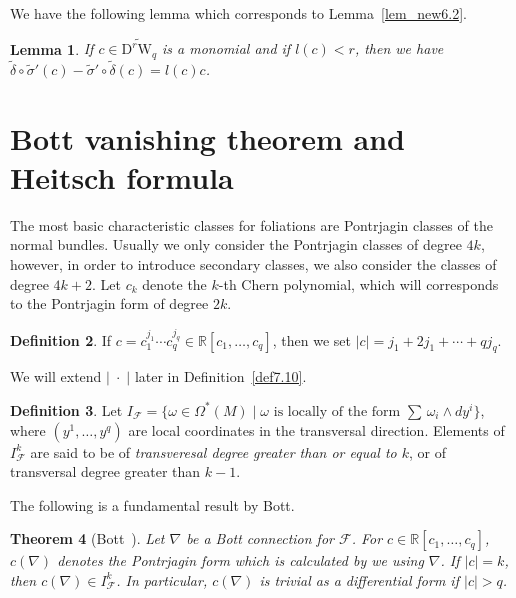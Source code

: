 \documentclass[12pt]{amsart}
\newcommand{\CF}{{\mathcal F}}
\newcommand{\R}{{\mathbb R}}
\newcommand{\W}{\mathrm{W}}
\newcommand{\D}{\mathrm{D}}
\DeclareMathOperator{\ord}{\mathrm{ord}}
\newcommand{\norm}[1]{\lvert#1\rvert}
\newtheorem{theorem}{Theorem}[section]
\newtheorem{lemma}[theorem]{Lemma}
\theoremstyle{definition}
\newtheorem{definition}[theorem]{Definition}
\theoremstyle{remark}
\begin{document}
We have the following lemma which corresponds to Lemma~\ref{lem_new6.2}.

\begin{lemma}
\label{lem6.9}
If $c\in\widetilde{\D^r\W_q}$ is a monomial and if $l(c)<r$, then we have $\widetilde\delta\circ\widetilde\sigma'(c)-\widetilde\sigma'\circ\widetilde\delta(c)=l(c)c$.
\end{lemma}

\section{Bott vanishing theorem and Heitsch formula}
The most basic characteristic classes for foliations are Pontrjagin classes of the normal bundles.
Usually we only consider the Pontrjagin classes of degree $4k$, however, in order to introduce secondary classes, we also consider the classes of degree $4k+2$.
Let $c_k$ denote the $k$-th Chern polynomial, which will corresponds to the Pontrjagin form of degree $2k$.

\begin{definition}
\label{def6.1}
If $c=c_1^{j_1}\cdots c_q^{j_q}\in\R[c_1,\ldots,c_q]$, then we set $\norm{c}=j_1+2j_1+\cdots+qj_q$.
\end{definition}
We will extend $\norm{\;\cdot\;}$ later in Definition~\ref{def7.10}.

\begin{definition}
Let $I_\CF=\{\omega\in\Omega^*(M)\mid\text{$\omega$ is locally of the form $\textstyle{\sum}\,\omega_i\wedge dy^i$}\}$, where $(y^1,\ldots,y^q)$ are local coordinates in the transversal direction.
Elements of $I_\CF^k$ are said to be of \textit{transveresal degree greater than or equal to $k$}, or of transversal degree greater than $k-1$.
\end{definition}

The following is a fundamental result by Bott.

\begin{theorem}[Bott~\cite{Bott:LNM}]
Let $\nabla$ be a Bott connection for $\CF$.
For $c\in\R[c_1,\ldots,c_q]$, $c(\nabla)$ denotes the Pontrjagin form which is calculated by we using $\nabla$.
If $\norm{c}=k$, then $c(\nabla)\in I_\CF^k$.
In particular, $c(\nabla)$ is trivial as a differential form if $\norm{c}>q$.
\end{theorem}
\end{document}
